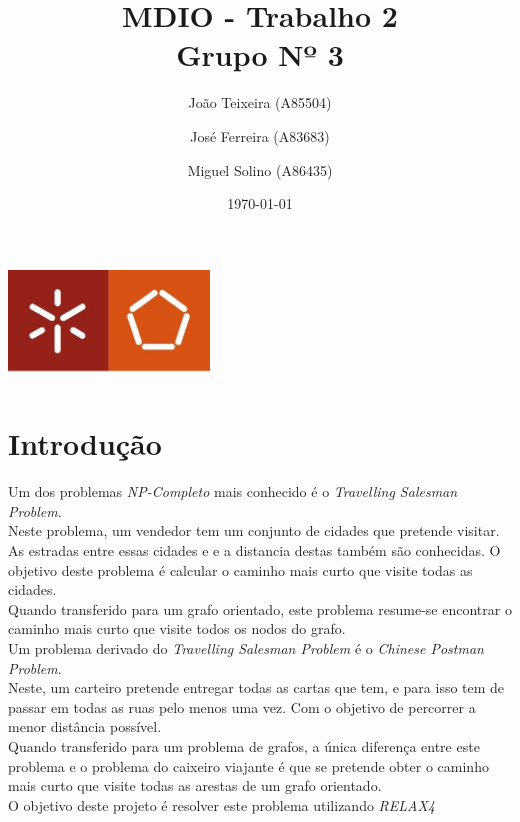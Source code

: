 \documentclass[a4paper]{report}
\begin{document}
\title{MDIO - Trabalho 2\\ 
\large Grupo Nº 3}
\author{João Teixeira (A85504) \and José Ferreira (A83683) \and Miguel Solino (A86435)}
\date{\today}

\begin{center}
    \begin{minipage}{0.75\linewidth}
        \centering
        \includegraphics[width=0.4\textwidth]{images/eng.jpeg}\par\vspace{1cm}
        \vspace{1.5cm}
        \href{https://www.uminho.pt/PT}
        {\color{black}{\scshape\LARGE Universidade do Minho}} \par
        \vspace{1cm}
        \href{https://www.di.uminho.pt/}
        {\color{black}{\scshape\Large Departamento de Informática}} \par
        \vspace{1.5cm}
        \maketitle
    \end{minipage}
\end{center}

\tableofcontents

\pagebreak

\chapter{Introdução}
Um dos problemas \textit{NP-Completo} mais conhecido é o \textit{Travelling
Salesman Problem}. \\
Neste problema, um vendedor tem um conjunto de cidades que pretende visitar. As
estradas entre essas cidades e e a distancia destas também são conhecidas. O
objetivo deste problema é calcular o caminho mais curto que visite todas as
cidades.\\
Quando transferido para um grafo orientado, este problema resume-se
encontrar o caminho mais curto que visite todos os nodos do grafo.\\
Um problema derivado do \textit{Travelling Salesman Problem} é o \textit{Chinese
Postman Problem}.\\
Neste, um carteiro pretende entregar todas as cartas que tem, e para isso tem de
passar em todas as ruas pelo menos uma vez. Com o objetivo de percorrer a menor
distância possível.\\
Quando transferido para um problema de grafos, a única diferença entre este
problema e o problema do caixeiro viajante é que se pretende obter o caminho
mais curto que visite todas as arestas de um grafo orientado. \\
O objetivo deste projeto é resolver este problema utilizando \textit{RELAX4}
\end{document}
